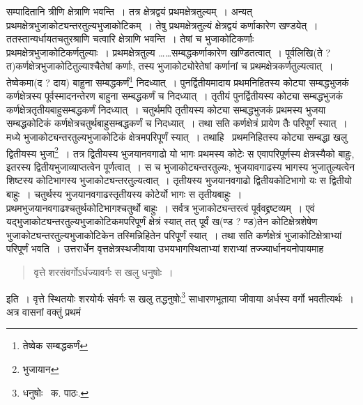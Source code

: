 \documentclass[11pt, openany]{book}
\begin{document}
\noindent सम्पादितानि त्रीणि क्षेत्राणि भवन्ति~। तत्र क्षेत्रद्वयं प्रथमक्षेत्रतुल्यम्~। अन्यत् प्रथमक्षेत्रभुजाकोट्यन्तरतुल्यभुजाकोटिकम्~। तेषु
प्रथमक्षेत्रतुल्यं क्षेत्रद्वयं कर्णाकारेण खण्डयेत्~। ततस्तान्यर्धायतचतुरश्राणि चत्वारि क्षेत्राणि भवन्ति~। तेषां च भुजाकोटिकर्णाः प्रथमक्षेत्रभुजाकोटिकर्णतुल्याः~। प्रथमक्षेत्रतुल्य \ldots \ldots सम्बद्धकर्णाकारेण खण्डितत्वात्~। पूर्वलिखि(ते ? त)कर्णक्षेत्रभुजाकोटितुल्याश्चैतेषां कर्णाः, तस्य भुजाकोट्योरेतेषां कर्णानां च प्रथमक्षेत्रकर्णतुल्यत्वात्~। तेष्वेकमा(द ? दाय) बाहुना
सम्बद्धकर्णं\renewcommand{\thefootnote}{१}\footnote{तेष्वेक सम्बद्धकर्णं} निदध्यात्~। पुनर्द्वितीयमादाय प्रथमनिहितस्य कोट्या सम्बद्धभुजकं कर्णक्षेत्रस्य पूर्वस्मादनन्तेरण बाहुना सम्बद्धकर्णं च निदध्यात्~। तृतीयं पुनर्द्वितीयस्य कोट्या सम्बद्धभुजकं कर्णक्षेत्रतृतीयबाहुसम्बद्धकर्णं निदध्यात्~। चतुर्थमपि तृतीयस्य कोट्या सम्बद्धभुजकं प्रथमस्य भुजया सम्बद्धकोटिकं कर्णक्षेत्रचतुर्थबाहुसम्बद्धकर्णं च निदध्यात्~। तथा सति कर्णक्षेत्रं प्रायेण तैः परिपूर्णं स्यात्~। मध्ये भुजाकोट्यन्तरतुल्यभुजाकोटिकं क्षेत्रमपरिपूर्णं स्यात्~। तथाहि \textendash\ प्रथमनिहितस्य कोट्या सम्बद्धा खलु द्वितीयस्य भुजा\renewcommand{\thefootnote}{२}\footnote{भुजायान}~। तत्र द्वितीयस्य भुजयानवगाढो यो भागः प्रथमस्य कोटेः स एवापरिपूर्णस्य क्षेत्रस्यैको बाहुः, इतरस्य द्वितीयभुजाव्याप्तत्वेन पूर्णत्वात्~। स च भुजाकोट्यन्तरतुल्यः, भुजयावगाढस्य भागस्य भुजातुल्यत्वेन शिष्टस्य कोटिभागस्य भुजाकोट्यन्तरतुल्यत्वात्~। तृतीयस्य भुजयानवगाढो द्वितीयकोटिभागो यः स द्वितीयो बाहुः~। चतुर्थस्य भुजयानवगाढस्तृतीयस्य कोटेर्यो भागः स तृतीयबाहुः~। प्रथमभुजयानवगाढश्चतुर्थकोटिभागश्चतुर्थो बाहुः~। सर्वत्र भुजाकोट्यन्तरत्वं पूर्ववद्द्रष्टव्यम्~। एवं यद्भुजाकोट्यन्तरतुल्यभुजाकोटिकमपरिपूर्णं क्षेत्रं स्यात् तत् पूर्वं ख(ण्ड ? ण्ड)तेन कोटिक्षेत्रशेषेण भुजाकोट्यन्तरतुल्यभुजाकोटिकेन तस्मिन्निहितेन परिपूर्णं स्यात्~। तथा सति कर्णक्षेत्रं भुजाकोटिक्षेत्राभ्यां परिपूर्णं भवति~। उत्तरार्धेन वृत्तक्षेत्रस्थजीवाया उभयभागस्थिताभ्यां शराभ्यां तज्ज्यार्धानयनोपायमाह\textendash 

\begin{quote}
{\qt वृत्ते शरसंवर्गोऽर्धज्यावर्गः स खलु धनुषोः~।}
\end{quote}

\noindent इति~। वृत्ते स्थितयोः शरयोर्यः संवर्गः स खलु तद्धनुषोः\renewcommand{\thefootnote}{३}\footnote{धनुषोः \textendash\ क. पाठः.} साधारणभूताया जीवाया अर्धस्य वर्गो भवतीत्यर्थः~। अत्र वासनां वक्तुं प्रथमं

\newpage
\end{document}
